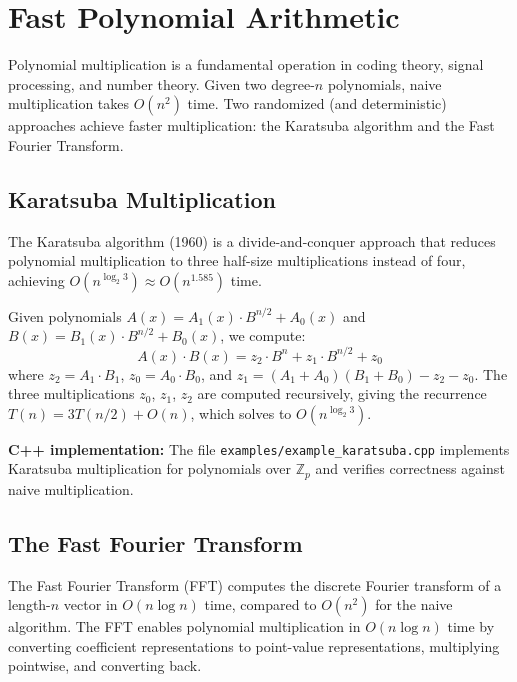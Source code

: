 \documentclass[twoside,12pt]{book}
\theoremstyle{plain}
\theoremstyle{definition}
\theoremstyle{remark}
\newenvironment{cpplisting}{\begin{center}\small}{\end{center}}
\begin{document}
\section{Fast Polynomial Arithmetic}
\label{sec:fast-poly}

Polynomial multiplication is a fundamental operation in coding theory, signal processing, and number theory. Given two degree-$n$ polynomials, naive multiplication takes $O(n^2)$ time. Two randomized (and deterministic) approaches achieve faster multiplication: the Karatsuba algorithm and the Fast Fourier Transform.

\subsection{Karatsuba Multiplication}

The Karatsuba algorithm (1960) is a divide-and-conquer approach that reduces polynomial multiplication to three half-size multiplications instead of four, achieving $O(n^{\log_2 3}) \approx O(n^{1.585})$ time.

Given polynomials $A(x) = A_1(x) \cdot B^{n/2} + A_0(x)$ and $B(x) = B_1(x) \cdot B^{n/2} + B_0(x)$, we compute:
\[
A(x) \cdot B(x) = z_2 \cdot B^n + z_1 \cdot B^{n/2} + z_0
\]
where $z_2 = A_1 \cdot B_1$, $z_0 = A_0 \cdot B_0$, and $z_1 = (A_1 + A_0)(B_1 + B_0) - z_2 - z_0$. The three multiplications $z_0$, $z_1$, $z_2$ are computed recursively, giving the recurrence $T(n) = 3T(n/2) + O(n)$, which solves to $O(n^{\log_2 3})$.

\begin{cpplisting}
\textbf{C++ implementation:} The file \texttt{examples/example\_karatsuba.cpp} implements Karatsuba multiplication for polynomials over $\mathbb{Z}_p$ and verifies correctness against naive multiplication.
\end{cpplisting}

\subsection{The Fast Fourier Transform}

The Fast Fourier Transform (FFT) computes the discrete Fourier transform of a length-$n$ vector in $O(n \log n)$ time, compared to $O(n^2)$ for the naive algorithm. The FFT enables polynomial multiplication in $O(n \log n)$ time by converting coefficient representations to point-value representations, multiplying pointwise, and converting back.
\end{document}
